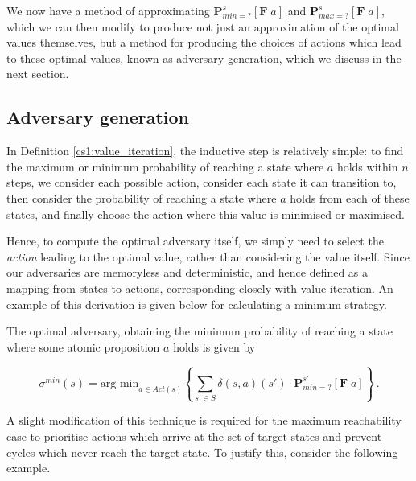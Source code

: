 We now have a method of approximating $\mathbf{P}^{s}_{min =?} [\mathbf{F} \; a]$ and $\mathbf{P}^{s}_{max =?} [\mathbf{F} \; a]$, which we can then modify to produce not just an approximation of the optimal values themselves, but a method for producing the choices of actions which lead to these optimal values, known as adversary generation, which we discuss in the next section.

\subsection{Adversary generation}
\label{cs1:adversary_gen}

In Definition \ref{cs1:value_iteration}, the inductive step is relatively simple: to find the maximum or minimum probability of reaching a state where $a$ holds within $n$ steps, we consider each possible action, consider each state it can transition to, then consider the probability of reaching a state where $a$ holds from each of these states, and finally choose the action where this value is minimised or maximised.

Hence, to compute the optimal adversary itself, we simply need to select the \emph{action} leading to the optimal value, rather than considering the value itself. Since our adversaries are memoryless and deterministic, and hence defined as a mapping from states to actions, corresponding closely with value iteration. An example of this derivation is given below for calculating a minimum strategy.

\begin{definition}
\label{cs1:min_adv_generation}

The optimal adversary, obtaining the minimum probability of reaching a state where some atomic proposition $a$ holds is given by

\begin{equation*}
    \sigma^{min}(s) = \text{arg min}_{a \in Act(s)} \left\{ \mbox{$\sum_{s' \in S}$} \delta(s, a)(s') \cdot \mathbf{P}^{s'}_{min =?} [\mathbf{F} \; a]\right\} \, .
\end{equation*}

\end{definition}

A slight modification of this technique is required for the maximum reachability case to prioritise actions which arrive at the set of target states and prevent cycles which never reach the target state. To justify this, consider the following example.


